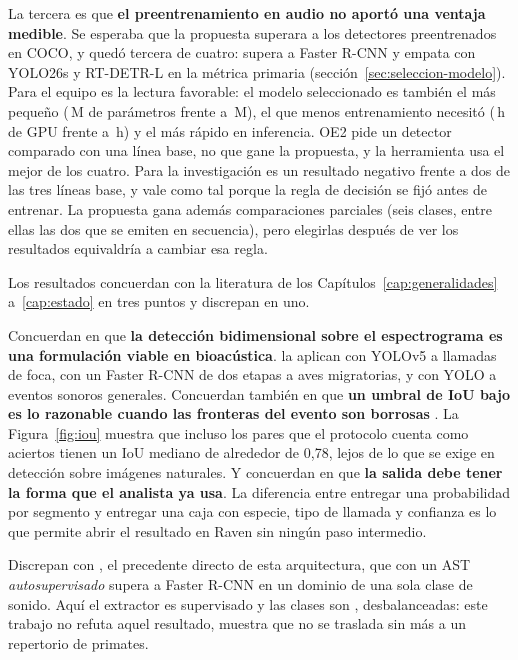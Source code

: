 La tercera es que \textbf{el preentrenamiento en audio no aportó una ventaja
    medible}. Se esperaba que la propuesta superara a los detectores
preentrenados en COCO, y quedó tercera de cuatro: supera a Faster R-CNN y empata
con YOLO26s y RT-DETR-L en la métrica primaria
(sección~\ref{sec:seleccion-modelo}). Para el equipo es la lectura favorable: el
modelo seleccionado es también el más pequeño (\cParamsYol{}\,M de parámetros
frente a \cParamsDet{}\,M), el que menos entrenamiento necesitó (\cHoursYol{}\,h
de GPU frente a \cHoursDet{}\,h) y el más rápido en inferencia. OE2 pide un
detector comparado con una línea base, no que gane la propuesta, y la
herramienta usa el mejor de los cuatro. Para la investigación es un resultado
negativo frente a dos de las tres líneas base, y vale como tal porque la regla de
decisión se fijó antes de entrenar. La propuesta gana además comparaciones
parciales (seis clases, entre ellas las dos que se emiten en secuencia), pero
elegirlas después de ver los resultados equivaldría a cambiar esa regla.

 Los resultados concuerdan con la
literatura de los Capítulos~\ref{cap:generalidades} a~\ref{cap:estado} en tres
puntos y discrepan en uno.

Concuerdan en que \textbf{la detección bidimensional sobre el espectrograma es
    una formulación viable en bioacústica}. \citet{escobar-amado_computer_2024}
la aplican con YOLOv5 a llamadas de foca, \citet{airale_nbm_2025} con un Faster
R-CNN de dos etapas a aves migratorias, y \citet{gonzalez_yolo-based_2025} con
YOLO a eventos sonoros generales. Concuerdan también en que \textbf{un umbral de
    IoU bajo es lo razonable cuando las fronteras del evento son borrosas}
\citep{zhu_sound_2025}. La Figura~\ref{fig:iou} muestra que incluso los pares que
el protocolo cuenta como aciertos tienen un IoU mediano de alrededor de 0,78,
lejos de lo que se exige en detección sobre imágenes naturales. Y concuerdan en
que \textbf{la salida debe tener la forma que el analista ya usa}. La diferencia
entre entregar una probabilidad por segmento \citep{kahl_birdnet_2021} y entregar
una caja con especie, tipo de llamada y confianza es lo que permite abrir el
resultado en Raven sin ningún paso intermedio.

Discrepan con \citet{zhu_sound_2025}, el precedente directo de esta arquitectura,
que con un AST \emph{autosupervisado} supera a Faster R-CNN en un dominio de una
sola clase de sonido. Aquí el extractor es supervisado y las clases son
\nClasses{}, desbalanceadas: este trabajo no refuta aquel resultado, muestra que
no se traslada sin más a un repertorio de primates.

